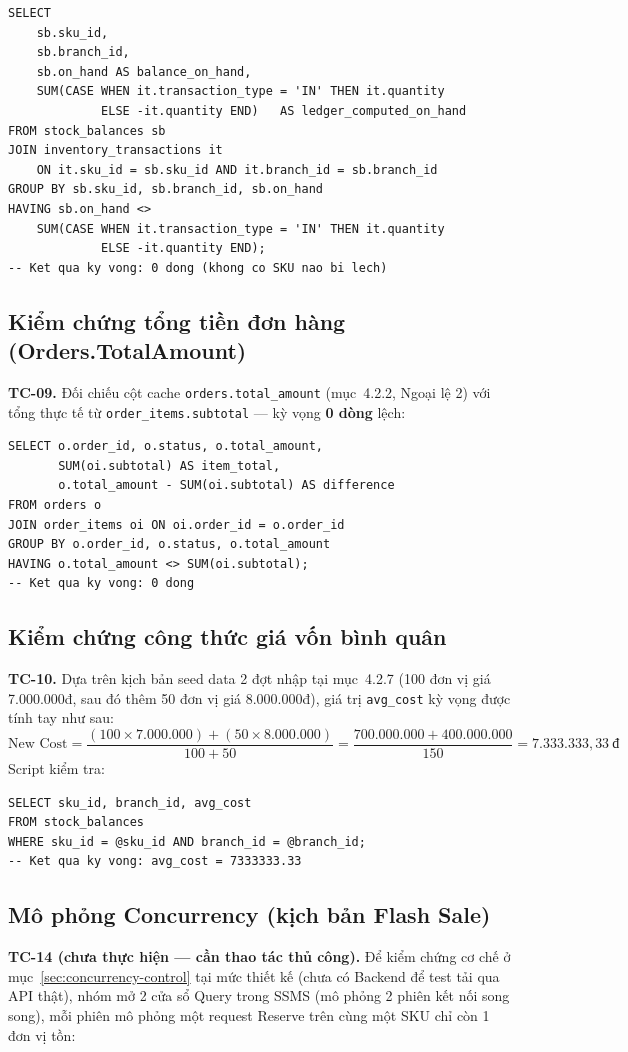 \begin{lstlisting}
SELECT
    sb.sku_id,
    sb.branch_id,
    sb.on_hand AS balance_on_hand,
    SUM(CASE WHEN it.transaction_type = 'IN' THEN it.quantity
             ELSE -it.quantity END)   AS ledger_computed_on_hand
FROM stock_balances sb
JOIN inventory_transactions it
    ON it.sku_id = sb.sku_id AND it.branch_id = sb.branch_id
GROUP BY sb.sku_id, sb.branch_id, sb.on_hand
HAVING sb.on_hand <>
    SUM(CASE WHEN it.transaction_type = 'IN' THEN it.quantity
             ELSE -it.quantity END);
-- Ket qua ky vong: 0 dong (khong co SKU nao bi lech)
\end{lstlisting}

\subsection{Kiểm chứng tổng tiền đơn hàng (Orders.TotalAmount)}
\textbf{TC-09.} Đối chiếu cột cache \texttt{orders.total\_amount} (mục~4.2.2, Ngoại lệ 2) với tổng thực tế từ \texttt{order\_items.subtotal} — kỳ vọng \textbf{0 dòng} lệch:
\begin{lstlisting}
SELECT o.order_id, o.status, o.total_amount,
       SUM(oi.subtotal) AS item_total,
       o.total_amount - SUM(oi.subtotal) AS difference
FROM orders o
JOIN order_items oi ON oi.order_id = o.order_id
GROUP BY o.order_id, o.status, o.total_amount
HAVING o.total_amount <> SUM(oi.subtotal);
-- Ket qua ky vong: 0 dong
\end{lstlisting}

\subsection{Kiểm chứng công thức giá vốn bình quân}
\textbf{TC-10.} Dựa trên kịch bản seed data 2 đợt nhập tại mục~4.2.7 (100 đơn vị giá 7.000.000đ, sau đó thêm 50 đơn vị giá 8.000.000đ), giá trị \texttt{avg\_cost} kỳ vọng được tính tay như sau:
\[
\text{New Cost} = \frac{(100 \times 7.000.000) + (50 \times 8.000.000)}{100 + 50} = \frac{700.000.000 + 400.000.000}{150} = 7.333.333,33\ \text{đ}
\]
Script kiểm tra:
\begin{lstlisting}
SELECT sku_id, branch_id, avg_cost
FROM stock_balances
WHERE sku_id = @sku_id AND branch_id = @branch_id;
-- Ket qua ky vong: avg_cost = 7333333.33
\end{lstlisting}

\subsection{Mô phỏng Concurrency (kịch bản Flash Sale)}
\label{sec:concurrency-test}
\textbf{TC-14 (chưa thực hiện — cần thao tác thủ công).} Để kiểm chứng cơ chế ở mục~\ref{sec:concurrency-control} tại mức thiết kế (chưa có Backend để test tải qua API thật), nhóm mở 2 cửa sổ Query trong SSMS (mô phỏng 2 phiên kết nối song song), mỗi phiên mô phỏng một request Reserve trên cùng một SKU chỉ còn 1 đơn vị tồn:


